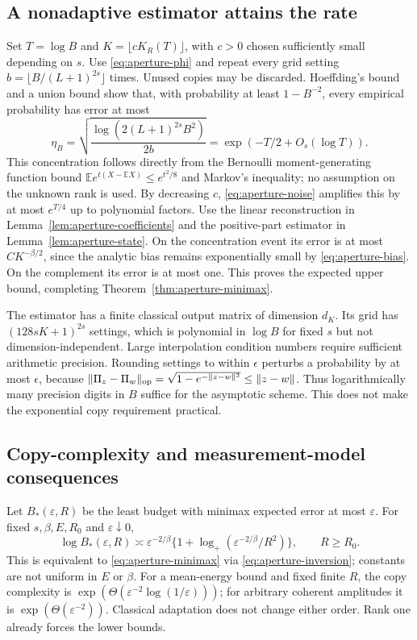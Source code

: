 \subsection{A nonadaptive estimator attains the rate}
Set $T=\log B$ and $K=\lfloor cK_R(T)\rfloor$, with $c>0$ chosen sufficiently
small depending on $s$. Use \eqref{eq:aperture-phi} and repeat every grid
setting $b=\lfloor B/(L+1)^{2s}\rfloor$ times. Unused copies may be discarded.
Hoeffding's bound and a union bound show that, with probability at least
$1-B^{-2}$, every empirical probability has error at most
\[
 \eta_B=\sqrt{\frac{\log(2(L+1)^{2s}B^2)}{2b}}
            =\exp(-T/2+O_s(\log T)).
 \tag{A.19}\label{eq:aperture-hoeffding}
\]
This concentration follows directly from the Bernoulli moment-generating
function bound $\mathbb E e^{t(X-\mathbb EX)}\le e^{t^2/8}$ and Markov's
inequality; no assumption on the unknown rank is used.
By decreasing $c$, \eqref{eq:aperture-noise} amplifies this by at most
$e^{T/4}$ up to polynomial factors. Use the linear reconstruction in
Lemma~\ref{lem:aperture-coefficients} and the positive-part estimator in
Lemma~\ref{lem:aperture-state}. On the concentration event its error is
at most $C K^{-\beta/2}$, since the analytic bias remains exponentially
small by \eqref{eq:aperture-bias}. On the complement its error is at most one.
This proves the expected upper bound, completing
Theorem~\ref{thm:aperture-minimax}.

The estimator has a finite classical output matrix of dimension $d_K$.
Its grid has $(128sK+1)^{2s}$ settings, which is polynomial in $\log B$ for
fixed $s$ but not dimension-independent. Large interpolation condition
numbers require sufficient arithmetic precision. Rounding settings to within
$\epsilon$ perturbs a probability by at most $\epsilon$, because
$\|\Pi_z-\Pi_w\|_{\rm op}=\sqrt{1-e^{-\|z-w\|^2}}\le\|z-w\|$.
Thus logarithmically many precision digits in $B$ suffice for the asymptotic
scheme. This does not make the exponential copy requirement practical.

\subsection{Copy-complexity and measurement-model consequences}
Let $B_*(\varepsilon,R)$ be the least budget with minimax expected error at
most $\varepsilon$. For fixed $s,\beta,E,R_0$ and $\varepsilon\downarrow0$,
\[
 \boxed{
 \log B_*(\varepsilon,R)
 \asymp \varepsilon^{-2/\beta}
                \{1+\log_+(\varepsilon^{-2/\beta}/R^2)\},
 \qquad R\ge R_0.
 }
 \tag{A.20}\label{eq:aperture-complexity}
\]
This is equivalent to \eqref{eq:aperture-minimax} via
\eqref{eq:aperture-inversion}; constants are not uniform in $E$ or $\beta$.
For a mean-energy bound and fixed finite $R$, the copy complexity is
$\exp(\Theta(\varepsilon^{-2}\log(1/\varepsilon)))$; for arbitrary coherent
amplitudes it is $\exp(\Theta(\varepsilon^{-2}))$.
Classical adaptation does not change either order. Rank one already forces
the lower bounds.

